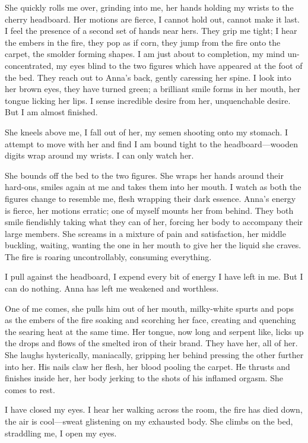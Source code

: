 \documentclass[
]{article}
\begin{document}
She quickly rolls me over, grinding into me, her hands holding my wrists
to the cherry headboard. Her motions are fierce, I cannot hold out,
cannot make it last. I feel the presence of a second set of hands near
hers. They grip me tight; I hear the embers in the fire, they pop as if
corn, they jump from the fire onto the carpet, the smolder forming
shapes. I am just about to completion, my mind un-concentrated, my eyes
blind to the two figures which have appeared at the foot of the bed.
They reach out to Anna's back, gently caressing her spine. I look into
her brown eyes, they have turned green; a brilliant smile forms in her
mouth, her tongue licking her lips. I sense incredible desire from her,
unquenchable desire. But I am almost finished.

She kneels above me, I fall out of her, my semen shooting onto my
stomach. I attempt to move with her and find I am bound tight to the
headboard---wooden digits wrap around my wrists. I can only watch her.

She bounds off the bed to the two figures. She wraps her hands around
their hard-ons, smiles again at me and takes them into her mouth. I
watch as both the figures change to resemble me, flesh wrapping their
dark essence. Anna's energy is fierce, her motions erratic; one of
myself mounts her from behind. They both smile fiendishly taking what
they can of her, forcing her body to accompany their large members. She
screams in a mixture of pain and satisfaction, her middle buckling,
waiting, wanting the one in her mouth to give her the liquid she craves.
The fire is roaring uncontrollably, consuming everything.

I pull against the headboard, I expend every bit of energy I have left
in me. But I can do nothing. Anna has left me weakened and worthless.

One of me comes, she pulls him out of her mouth, milky-white spurts and
pops as the embers of the fire soaking and scorching her face, creating
and quenching the searing heat at the same time. Her tongue, now long
and serpent like, licks up the drops and flows of the smelted iron of
their brand. They have her, all of her. She laughs hysterically,
maniacally, gripping her behind pressing the other further into her. His
nails claw her flesh, her blood pooling the carpet. He thrusts and
finishes inside her, her body jerking to the shots of his inflamed
orgasm. She comes to rest.

I have closed my eyes. I hear her walking across the room, the fire has
died down, the air is cool---sweat glistening on my exhausted body. She
climbs on the bed, straddling me, I open my eyes.
\end{document}
